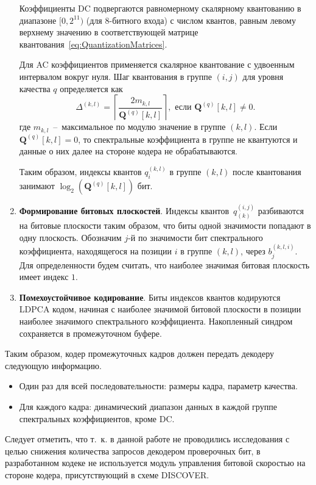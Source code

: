 \begin{enumerate}
  Коэффициенты DC подвергаются равномерному скалярному квантованию в диапазоне $[0,2^{11})$ (для $8$-битного входа) с числом квантов, равным левому верхнему значению в соответствующей матрице квантования~\ref{eq:QuantizationMatrices}.
  
  Для AC коэффициентов применяется скалярное квантование с удвоенным интервалом вокруг нуля. Шаг квантования в группе $(i,j)$ для уровня качества $q$ определяется как
  \begin{equation*}
  \Delta^{(k,l)} = \left\lceil\frac{2 m_{k,l}}{\mathbf{Q}^{(q)}[k,l]}\right\rceil,\text{ если $\mathbf{Q}^{(q)}[k,l] \neq 0$}.
  \end{equation*}
  где $m_{k,l}$~--~максимальное по модулю значение в группе $(k,l)$. Если $\mathbf{Q}^{(q)}[k,l] = 0$, то спектральные коэффициента в группе не квантуются и данные о них далее на стороне кодера не обрабатываются.
  
  Таким образом, индексы квантов $q_i^{(k,l)}$ в группе $(k,l)$ после квантования занимают $\log_2{\left(\mathbf{Q}^{(q)}[k,l]\right)}$ бит.
  
  \item\label{DVCEncoder:BitplaneExtraction} \textbf{Формирование битовых плоскостей}. Индексы квантов~$q_{(k)}^{(i,j)}$ разбиваются на битовые плоскости таким образом, что биты одной значимости попадают в одну плоскость. Обозначим $j$-й по значимости бит спектрального коэффициента, находящегося на позиции $i$ в группе $(k,l)$, через $b_j^{(k,l,i)}$. Для определенности будем считать, что наиболее значимая битовая плоскость имеет индекс $1$.
  
  \item \textbf{Помехоустойчивое кодирование}. Биты индексов квантов кодируются LDPCA кодом, начиная с наиболее значимой битовой плоскости в позиции наиболее значимого спектрального коэффициента. Накопленный синдром сохраняется в промежуточном буфере.
\end{enumerate}

Таким образом, кодер промежуточных кадров должен передать декодеру следующую информацию.
\begin{itemize}
  \item Один раз для всей последовательности: размеры кадра, параметр качества.
  \item Для каждого кадра: динамический диапазон данных в каждой группе спектральных коэффициентов, кроме DC.
\end{itemize}

Следует отметить, что т.~к. в данной работе не проводились исследования с целью снижения количества запросов декодером проверочных бит, в разработанном кодеке не используется модуль управления битовой скоростью на стороне кодера, присутствующий в схеме DISCOVER.

